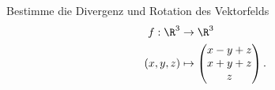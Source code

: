 \begin{prob}
Bestimme die Divergenz und Rotation des Vektorfelds 
    \begin{equation*}
        \begin{split}
            f:\R^3&\to\R^3\\
            (x,y,z)&\mapsto 
            \begin{pmatrix}
            x-y+z\\
            x+y+z\\
            z
            \end{pmatrix}.
        \end{split}
    \end{equation*}
\end{prob}

